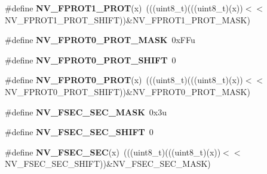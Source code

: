 \begin{DoxyCompactItemize}
\item 
\#define {\bfseries N\+V\+\_\+\+F\+P\+R\+O\+T1\+\_\+\+P\+R\+OT}(x)~(((uint8\+\_\+t)(((uint8\+\_\+t)(x))$<$$<$N\+V\+\_\+\+F\+P\+R\+O\+T1\+\_\+\+P\+R\+O\+T\+\_\+\+S\+H\+I\+FT))\&N\+V\+\_\+\+F\+P\+R\+O\+T1\+\_\+\+P\+R\+O\+T\+\_\+\+M\+A\+SK)\hypertarget{group__NV__Register__Masks_ga04b1531f415057befbd26a0bad3bd7e6}{}\label{group__NV__Register__Masks_ga04b1531f415057befbd26a0bad3bd7e6}

\item 
\#define {\bfseries N\+V\+\_\+\+F\+P\+R\+O\+T0\+\_\+\+P\+R\+O\+T\+\_\+\+M\+A\+SK}~0x\+F\+Fu\hypertarget{group__NV__Register__Masks_gafb9244a297e4e856c53e7cb9515d8549}{}\label{group__NV__Register__Masks_gafb9244a297e4e856c53e7cb9515d8549}

\item 
\#define {\bfseries N\+V\+\_\+\+F\+P\+R\+O\+T0\+\_\+\+P\+R\+O\+T\+\_\+\+S\+H\+I\+FT}~0\hypertarget{group__NV__Register__Masks_gaaae2badd9a03af803a09537c6c89382a}{}\label{group__NV__Register__Masks_gaaae2badd9a03af803a09537c6c89382a}

\item 
\#define {\bfseries N\+V\+\_\+\+F\+P\+R\+O\+T0\+\_\+\+P\+R\+OT}(x)~(((uint8\+\_\+t)(((uint8\+\_\+t)(x))$<$$<$N\+V\+\_\+\+F\+P\+R\+O\+T0\+\_\+\+P\+R\+O\+T\+\_\+\+S\+H\+I\+FT))\&N\+V\+\_\+\+F\+P\+R\+O\+T0\+\_\+\+P\+R\+O\+T\+\_\+\+M\+A\+SK)\hypertarget{group__NV__Register__Masks_ga69a376822e2425a5933dc10569a42d3d}{}\label{group__NV__Register__Masks_ga69a376822e2425a5933dc10569a42d3d}

\item 
\#define {\bfseries N\+V\+\_\+\+F\+S\+E\+C\+\_\+\+S\+E\+C\+\_\+\+M\+A\+SK}~0x3u\hypertarget{group__NV__Register__Masks_gab159c721c6cde1f629b630c573da8ea9}{}\label{group__NV__Register__Masks_gab159c721c6cde1f629b630c573da8ea9}

\item 
\#define {\bfseries N\+V\+\_\+\+F\+S\+E\+C\+\_\+\+S\+E\+C\+\_\+\+S\+H\+I\+FT}~0\hypertarget{group__NV__Register__Masks_ga92a819b24b0472a83857ddd2d950ab08}{}\label{group__NV__Register__Masks_ga92a819b24b0472a83857ddd2d950ab08}

\item 
\#define {\bfseries N\+V\+\_\+\+F\+S\+E\+C\+\_\+\+S\+EC}(x)~(((uint8\+\_\+t)(((uint8\+\_\+t)(x))$<$$<$N\+V\+\_\+\+F\+S\+E\+C\+\_\+\+S\+E\+C\+\_\+\+S\+H\+I\+FT))\&N\+V\+\_\+\+F\+S\+E\+C\+\_\+\+S\+E\+C\+\_\+\+M\+A\+SK)\hypertarget{group__NV__Register__Masks_ga285ae0f5ea99f97dfae69dc7affebcde}{}\label{group__NV__Register__Masks_ga285ae0f5ea99f97dfae69dc7affebcde}


\end{DoxyCompactItemize}

